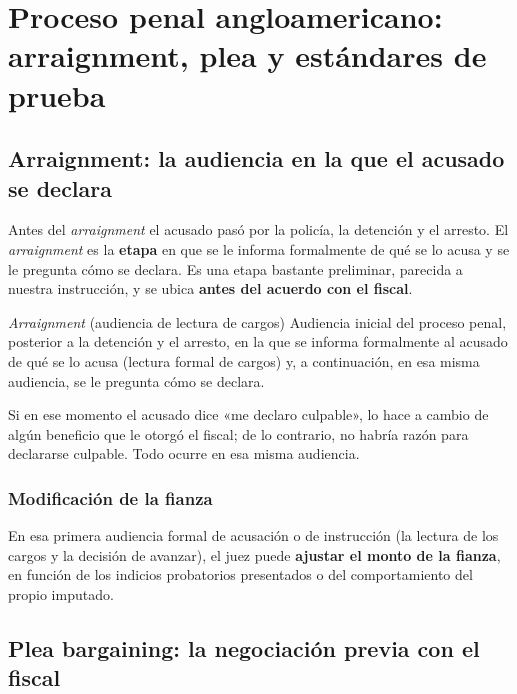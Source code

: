 \documentclass[12pt,oneside]{book}
\begin{document}
\chapter[Proceso penal angloamericano]{Proceso penal angloamericano: arraignment, plea y estándares de prueba}

\section{Arraignment: la audiencia en la que el acusado se declara}

Antes del \textit{arraignment} el acusado pasó por la policía, la detención y el arresto. El \textit{arraignment} es la \textbf{etapa} en que se le informa formalmente de qué se lo acusa y se le pregunta cómo se declara. Es una etapa bastante preliminar, parecida a nuestra instrucción, y se ubica \textbf{antes del acuerdo con el fiscal}.

\begin{definition}{\textit{Arraignment} (audiencia de lectura de cargos)}
Audiencia inicial del proceso penal, posterior a la detención y el arresto, en la que se informa formalmente al acusado de qué se lo acusa (lectura formal de cargos) y, a continuación, en esa misma audiencia, se le pregunta cómo se declara.
\end{definition}

Si en ese momento el acusado dice «me declaro culpable», lo hace a cambio de algún beneficio que le otorgó el fiscal; de lo contrario, no habría razón para declararse culpable. Todo ocurre en esa misma audiencia.

\subsection{Modificación de la fianza}

En esa primera audiencia formal de acusación o de instrucción (la lectura de los cargos y la decisión de avanzar), el juez puede \textbf{ajustar el monto de la fianza}, en función de los indicios probatorios presentados o del comportamiento del propio imputado.


\section{Plea bargaining: la negociación previa con el fiscal}
\end{document}
